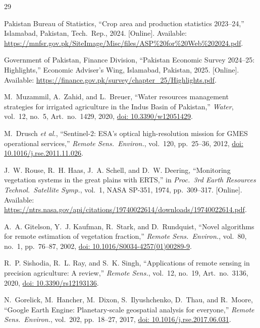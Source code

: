 \documentclass[conference]{IEEEtran}
\begin{document}
\begin{thebibliography}{29}

Pakistan Bureau of Statistics,
``Crop area and production statistics 2023--24,''
Islamabad, Pakistan, Tech.\ Rep., 2024. [Online]. Available: \url{https://mnfsr.gov.pk/SiteImage/Misc/files/ASP\%20for\%20Web\%202024.pdf}.

Government of Pakistan, Finance Division,
``Pakistan Economic Survey 2024--25: Highlights,''
Economic Adviser's Wing, Islamabad, Pakistan, 2025. [Online]. Available: \url{https://finance.gov.pk/survey/chapter_25/Highlights.pdf}.

M.~Muzammil, A.~Zahid, and L.~Breuer,
``Water resources management strategies for irrigated agriculture in the
Indus Basin of Pakistan,''
\textit{Water}, vol.~12, no.~5, Art.\ no.~1429, 2020,
\href{https://doi.org/10.3390/w12051429}{doi: 10.3390/w12051429}.

M.~Drusch \textit{et al.},
``Sentinel-2: ESA's optical high-resolution mission for GMES operational
services,''
\textit{Remote Sens.\ Environ.}, vol.~120, pp.~25--36, 2012,
\href{https://doi.org/10.1016/j.rse.2011.11.026}{doi: 10.1016/j.rse.2011.11.026}.

J.~W. Rouse, R.~H. Haas, J.~A. Schell, and D.~W. Deering,
``Monitoring vegetation systems in the great plains with ERTS,''
in \textit{Proc.\ 3rd Earth Resources Technol.\ Satellite Symp.},
vol.~1, NASA SP-351, 1974, pp.~309--317. [Online]. Available: \url{https://ntrs.nasa.gov/api/citations/19740022614/downloads/19740022614.pdf}.

A.~A. Gitelson, Y.~J. Kaufman, R.~Stark, and D.~Rundquist,
``Novel algorithms for remote estimation of vegetation fraction,''
\textit{Remote Sens.\ Environ.}, vol.~80, no.~1, pp.~76--87, 2002,
\href{https://doi.org/10.1016/S0034-4257(01)00289-9}{doi: 10.1016/S0034-4257(01)00289-9}.

R.~P. Sishodia, R.~L. Ray, and S.~K. Singh,
``Applications of remote sensing in precision agriculture: A review,''
\textit{Remote Sens.}, vol.~12, no.~19, Art.\ no.~3136, 2020,
\href{https://doi.org/10.3390/rs12193136}{doi: 10.3390/rs12193136}.

N.~Gorelick, M.~Hancher, M.~Dixon, S.~Ilyushchenko, D.~Thau, and R.~Moore,
``Google Earth Engine: Planetary-scale geospatial analysis for everyone,''
\textit{Remote Sens.\ Environ.}, vol.~202, pp.~18--27, 2017,
\href{https://doi.org/10.1016/j.rse.2017.06.031}{doi: 10.1016/j.rse.2017.06.031}.


\end{thebibliography}
\end{document}
